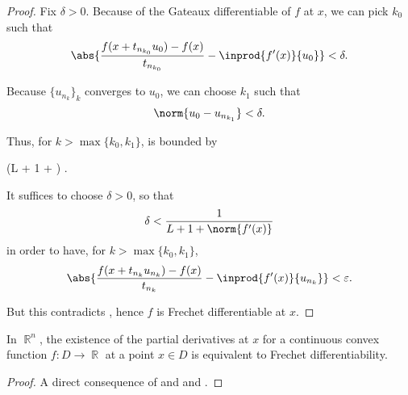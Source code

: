 \begin{proof}
  Fix \( \delta > 0 \). Because of the Gateaux differentiable of \( f \) at \( x \), we can pick \( k_0 \) such that
  \begin{equation*}
    \abs{\frac {f(x + t_{n_{k_0}} u_0) - f(x)} {t_{n_{k_0}}} - \inprod{f'(x)} {u_0}} < \delta.
  \end{equation*}

  Because \( \{ u_{n_k} \}_k \) converges to \( u_0 \), we can choose \( k_1 \) such that
  \begin{equation*}
    \norm{u_0 - u_{n_{k_1}}} < \delta.
  \end{equation*}

  Thus, for \( k > \max \{ k_0, k_1 \} \),  is bounded by
  \begin{balign*}
    \leq
    (L + 1 + ) \delta.
  \end{balign*}

  It suffices to choose \( \delta > 0 \), so that
  \begin{equation*}
    \delta < \frac 1 {L + 1 + \norm{f'(x)}}
  \end{equation*}
  in order to have, for \( k > \max \{ k_0, k_1 \} \),
  \begin{equation*}
    \abs{\frac {f(x + t_{n_k} u_{n_k}) - f(x)} {t_{n_k}} - \inprod{f'(x)} {u_{n_k}}} < \varepsilon.
  \end{equation*}

  But this contradicts , hence \( f \) is Frechet differentiable at \( x \).
\end{proof}

\begin{corollary}\label{thm:rn_continuous_convex_partial_derivatives_imply_frechet}
  In \( \BbbR^n \), the existence of the partial derivatives at \( x \) for a continuous convex function \( f: D \to \BbbR \) at a point \( x \in D \) is equivalent to Frechet differentiability.
\end{corollary}
\begin{proof}
  A direct consequence of and  and .
\end{proof}

